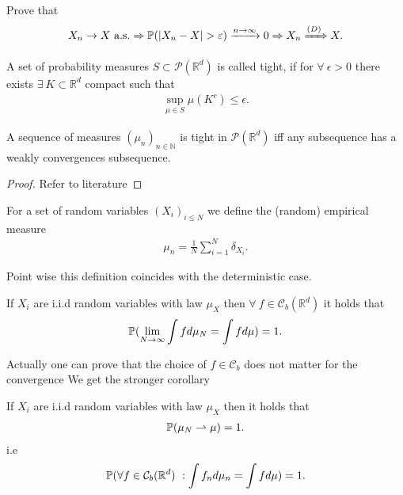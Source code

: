 \begin{exercise}
 Prove that 
 \begin{align*}
   X_n \to  X \ \text{a.s.} \implies \P(\abs{X_n - X} > \epsilon ) \xrightarrow{n\to \infty} 0 \implies X_n \xRightarrow{(D)} X
 .\end{align*}
\end{exercise}
\begin{definition}[Tightness]
 A set of probability measures $S \subset  \mathcal{P}(\mathbb{R}^{d} )$  is called tight, if 
 for $\forall \ \epsilon  > 0$ there exists $\exists \  K \subset  \mathbb{R}^{d} $ compact such that 
 \begin{align*}
   \sup_{\mu  \in  S} \mu(K^{c} )  \le  \epsilon 
 .\end{align*}
\end{definition}
\begin{theorem}
  A sequence of measures $(\mu_n)_{n \in  \mathbb{N}}$  is tight in $\mathcal{P}(\mathbb{R}^{d} )$ iff 
  any subsequence has a weakly convergences subsequence.
\end{theorem}
\begin{proof}
 Refer to literature 
\end{proof}
\begin{definition}
  For a set of  random variables $(X_i)_{i\le N}$  we define the (random) empirical measure 
  \begin{align*}
    \mu_n = \frac{1}{N}\sum_{i=1}^{N} \delta_{X_i} 
  .\end{align*}
\end{definition}
Point wise this definition coincides with the deterministic case.
\begin{corollary}
  If  $X_i$ are i.i.d random variables with law $\mu_{X}$ then  $\forall  \ f \in  \mathcal{C}_b(\mathbb{R}^{d} ) $ it holds that
  \begin{align*}
    \P(\lim_{N \to \infty} \int  f d \mu_N = \int f d\mu ) = 1
  .\end{align*}
\end{corollary}
Actually one can prove that the choice of $f \in  \mathcal{C}_b$ does not matter for the convergence 
We get the stronger corollary
\begin{corollary}
  If  $X_i$ are i.i.d random variables with law $\mu_{X}$ then  it holds that
\begin{align*}
  \P(\mu_N \rightharpoonup \mu ) = 1
.\end{align*}
i.e 
\begin{align*}
 \P( \forall  f \in  \mathcal{C}_b(\mathbb{R}^{d} ) \ : \int f_n d\mu_n = \int  f d\mu )  = 1
.\end{align*}
\end{corollary}
